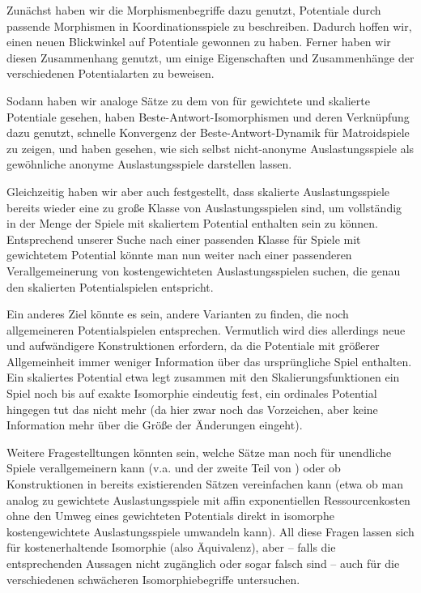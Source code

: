 \documentclass[a4paper,ngerman,11pt,bibliography=totoc]{scrartcl}
\theoremstyle{definition}
\theoremstyle{plain}
\theoremstyle{remark}
\begin{document}
Zunächst haben wir die Morphismenbegriffe dazu genutzt, Potentiale durch passende Morphismen in Koordinationsspiele zu beschreiben. Dadurch hoffen wir, einen neuen Blickwinkel auf Potentiale gewonnen zu haben. Ferner haben wir diesen Zusammenhang genutzt, um einige Eigenschaften und Zusammenhänge der verschiedenen Potentialarten zu beweisen.

Sodann haben wir analoge Sätze zu dem von \citeauthor{MonShap} für gewichtete und skalierte Potentiale gesehen, haben Beste-Antwort-Isomorphismen und deren Verknüpfung dazu genutzt, schnelle Konvergenz der Beste-Antwort-Dynamik für Matroidspiele zu zeigen, und haben gesehen, wie sich selbst nicht-anonyme Auslastungsspiele als gewöhnliche anonyme Auslastungsspiele darstellen lassen.

Gleichzeitig haben wir aber auch festgestellt, dass skalierte Auslastungsspiele bereits wieder eine zu große Klasse von Auslastungsspielen sind, um vollständig in der Menge der Spiele mit skaliertem Potential enthalten sein zu können. Entsprechend unserer Suche nach einer passenden Klasse für Spiele mit gewichtetem Potential könnte man nun weiter nach einer passenderen Verallgemeinerung von kostengewichteten Auslastungsspielen suchen, die genau den skalierten Potentialspielen entspricht. 

Ein anderes Ziel könnte es sein, andere Varianten zu finden, die noch allgemeineren Potentialspielen entsprechen. Vermutlich wird dies allerdings neue und aufwändigere Konstruktionen erfordern, da die Potentiale mit größerer Allgemeinheit immer weniger Information über das ursprüngliche Spiel enthalten. Ein skaliertes Potential etwa legt zusammen mit den Skalierungsfunktionen ein Spiel noch bis auf exakte Isomorphie eindeutig fest, ein ordinales Potential hingegen tut das nicht mehr (da hier zwar noch das Vorzeichen, aber keine Information mehr über die Größe der Änderungen eingeht).

Weitere Fragestelltungen könnten sein, welche Sätze man noch für unendliche Spiele verallgemeinern kann (v.a.  und der zweite Teil von ) oder ob Konstruktionen in bereits existierenden Sätzen vereinfachen kann (etwa ob man analog zu  gewichtete Auslastungsspiele mit affin exponentiellen Ressourcenkosten ohne den Umweg eines gewichteten Potentials direkt in isomorphe kostengewichtete Auslastungsspiele umwandeln kann). All diese Fragen lassen sich für kostenerhaltende Isomorphie (also Äquivalenz), aber -- falls die entsprechenden Aussagen nicht zugänglich oder sogar falsch sind -- auch für die verschiedenen schwächeren Isomorphiebegriffe untersuchen.

\newpage
\printbibliography
\end{document}
